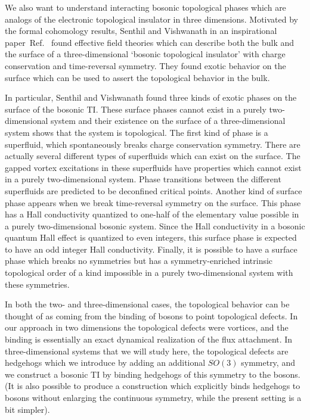 \documentclass[prb,twocolumn]{revtex4-1}
\begin{document}
We also want to understand interacting bosonic topological phases which are analogs of the electronic topological insulator in three dimensions. Motivated by the formal cohomology results,\cite{WenScience,*WenPRB} Senthil and Vishwanath in an inspirational paper~Ref.~ found effective field theories which can describe both the bulk and the surface of a three-dimensional `bosonic topological insulator' with charge conservation and time-reversal symmetry. They found exotic behavior on the surface which can be used to assert the topological behavior in the bulk.

In particular, Senthil and Vishwanath found three kinds of exotic phases on the surface of the bosonic TI. These surface phases cannot exist in a purely two-dimensional system and their existence on the surface of a three-dimensional system shows that the system is topological. The first kind of phase is a superfluid, which spontaneously breaks charge conservation symmetry. There are actually several different types of superfluids which can exist on the surface. The gapped vortex excitations in these superfluids have properties which cannot exist in a purely two-dimensional system.  Phase transitions between the different superfluids are predicted to be deconfined critical points. Another kind of surface phase appears when we break time-reversal symmetry on the surface. This phase has a Hall conductivity quantized to one-half of the elementary value possible in a purely two-dimensional bosonic system. Since the Hall conductivity in a bosonic quantum Hall effect is quantized to even integers, this surface phase is expected to have an odd integer Hall conductivity. Finally, it is possible to have a surface phase which breaks no symmetries but has a symmetry-enriched intrinsic topological order of a kind impossible in a purely two-dimensional system with these symmetries.

In both the two- and three-dimensional cases, the topological behavior can be thought of as coming from the binding of bosons to point topological defects. In our approach in two dimensions the topological defects were vortices, and the binding is essentially an exact dynamical realization of the flux attachment. In three-dimensional systems that we will study here, the topological defects are hedgehogs which we introduce by adding an additional $SO(3)$ symmetry, and we construct a bosonic TI by binding hedgehogs of this symmetry to the bosons.\cite{SenthilVishwanath} 
(It is also possible to produce a construction which explicitly binds hedgehogs to bosons without enlarging the continuous symmetry,\cite{Max} while the present setting is a bit simpler).
\end{document}
